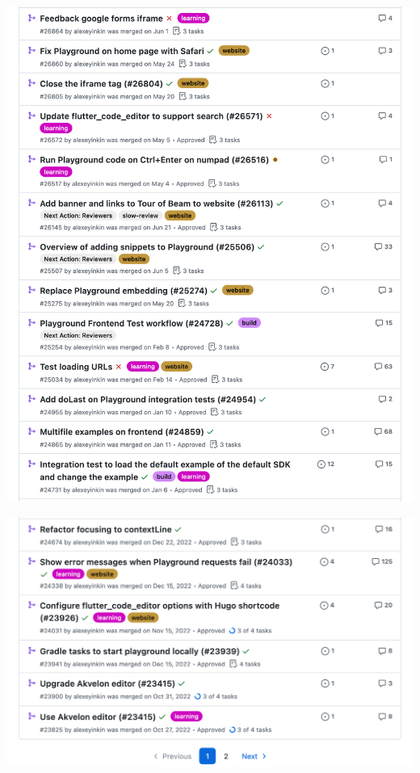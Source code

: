 \Continuing
\includegraphics[width=\textwidth]{github-prs-alexeyinkin-p2}
\WillContinue

\Continuing
\includegraphics[width=\textwidth]{github-prs-alexeyinkin-p3}

\pagebreak
